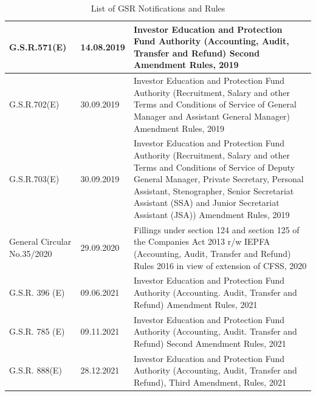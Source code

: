 \documentclass[openany]{book}
\begin{document}
\begin{table}[H]
\begin{tabular}{|p{3cm}|p{2.5cm}|p{10cm}|}
G.S.R.571(E) & 14.08.2019 & Investor Education and Protection Fund Authority (Accounting, Audit, Transfer and Refund) Second Amendment Rules, 2019 \\ \hline
G.S.R.702(E) & 30.09.2019 & Investor Education and Protection Fund Authority (Recruitment, Salary and other Terms and Conditions of Service of General Manager and Assistant General Manager) Amendment Rules, 2019 \\ \hline
G.S.R.703(E) & 30.09.2019 & Investor Education and Protection Fund Authority (Recruitment, Salary and other Terms and Conditions of Service of Deputy General Manager, Private Secretary, Personal Assistant, Stenographer, Senior Secretariat Assistant (SSA) and Junior Secretariat Assistant (JSA)) Amendment Rules, 2019 \\ \hline
General Circular No.35/2020 & 29.09.2020 & Fillings under section 124 and section 125 of the Companies Act 2013 r/w IEPFA (Accounting, Audit, Transfer and Refund) Rules 2016 in view of extension of CFSS, 2020 \\ \hline
G.S.R. 396 (E) & 09.06.2021 & Investor Education and Protection Fund Authority (Accounting. Audit, Transfer and Refund) Amendment Rules, 2021 \\ \hline
G.S.R. 785 (E) & 09.11.2021 & Investor Education and Protection Fund Authority (Accounting, Audit. Transfer and Refund) Second Amendment Rules, 2021 \\ \hline
G.S.R. 888(E) & 28.12.2021 & Investor Education and Protection Fund Authority (Accounting, Audit, Transfer and Refund), Third Amendment, Rules, 2021 \\ \hline
\end{tabular}
\caption{List of GSR Notifications and Rules}
\label{tab:gsr_rules}
\end{table}
\end{document}

